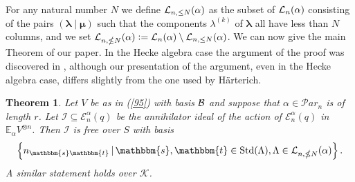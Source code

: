 \documentclass[10pt,a4,twoside,hidelinks,rm]{article}
\newcommand{\kk}{\mathcal{K}}
\newcommand{\Par}{{\mathcal Par}_n}
\newcommand\es{\mathbbm{s}}
\newcommand\et{\mathbbm{t}}
\newcommand{\std}{{\rm Std}}
\newcommand{\Ea}{ {\mathcal E}_n^{\alpha}(q)}
\newcommand\blambda{{\boldsymbol\lambda}}
\newcommand\be{\mathbb{E}}
\newcommand\bmu{{\boldsymbol\mu}}
\theoremstyle{plain}
\newtheorem{teo}{Theorem}%
\begin{document}
\medskip
For any natural number $ N $ we define $ {\cal L}_{n, \le N}(\alpha) $ as the
subset of $  {\cal L}_n(\alpha) $ consisting of the pairs $ (\blambda \mid \bmu )  $ such
that the components $\lambda^{(k)}$ of $ \blambda $ all have less than $ N $ columns, and
we set $ {\cal L}_{n, \nleq N}(\alpha) :={\cal L}_{n}(\alpha) \setminus
{\cal L}_{n, \le N}(\alpha) $.
We can now give the main Theorem of our paper.
In the Hecke algebra case the argument of the
proof was discovered in \cite{Har},  although our presentation of the argument, even in
the Hecke algebra case, 
differs slightly from the one {\color{black}used} by H\"{a}rterich.
\begin{teo}\label{mainT}
Let $ V $ be as in (\ref{95}) with basis 
$ \cal B $ and suppose that $ \alpha \in \Par $ is of length $ r$.
Let $ {\mathcal I} \subseteq \Ea$ be the annihilator ideal of the action of $ \Ea $ in
$    \be_{\alpha}V^{\otimes n} $.
  Then $ {\mathcal I} $ is free over $ S $ with basis
  \begin{equation}\label{110}
    \left\{ n_{\es\et} \, | \, \es, \et \in \std(\Lambda),
    \Lambda \in {\cal L}_{n, \nleq N}(\alpha)   \right\} .
  \end{equation}
A similar statement holds over $ \kk$.  
\end{teo}
\end{document}
